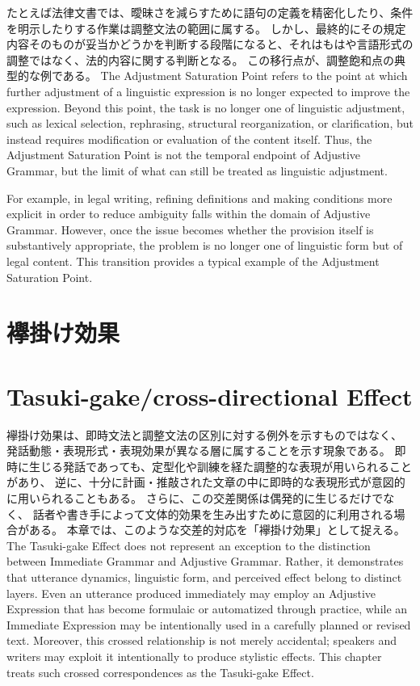 \documentclass[a4paper]{article}
\begin{document}
たとえば法律文書では、曖昧さを減らすために語句の定義を精密化したり、条件を明示したりする作業は調整文法の範囲に属する。
しかし、最終的にその規定内容そのものが妥当かどうかを判断する段階になると、それはもはや言語形式の調整ではなく、法的内容に関する判断となる。
この移行点が、調整飽和点の典型的な例である。
\else
The Adjustment Saturation Point refers to the point at which further adjustment of a linguistic expression is no longer expected to improve the expression.
Beyond this point, the task is no longer one of linguistic adjustment, such as lexical selection, rephrasing, structural reorganization, or clarification, but instead requires modification or evaluation of the content itself.
Thus, the Adjustment Saturation Point is not the temporal endpoint of Adjustive Grammar, but the limit of what can still be treated as linguistic adjustment.

For example, in legal writing, refining definitions and making conditions more explicit in order to reduce ambiguity falls within the domain of Adjustive Grammar.
However, once the issue becomes whether the provision itself is substantively appropriate, the problem is no longer one of linguistic form but of legal content.
This transition provides a typical example of the Adjustment Saturation Point.
\fi


\ifJPN
  \section{襷掛け効果}
\else
  \section{Tasuki-gake/cross-directional Effect}
\fi


\ifJPN
襷掛け効果は、即時文法と調整文法の区別に対する例外を示すものではなく、
発話動態・表現形式・表現効果が異なる層に属することを示す現象である。
即時に生じる発話であっても、定型化や訓練を経た調整的な表現が用いられることがあり、
逆に、十分に計画・推敲された文章の中に即時的な表現形式が意図的に用いられることもある。
さらに、この交差関係は偶発的に生じるだけでなく、
話者や書き手によって文体的効果を生み出すために意図的に利用される場合がある。
本章では、このような交差的対応を「襷掛け効果」として捉える。
\else
The Tasuki-gake Effect does not represent an exception to the distinction
between Immediate Grammar and Adjustive Grammar.
Rather, it demonstrates that utterance dynamics, linguistic form,
and perceived effect belong to distinct layers.
Even an utterance produced immediately may employ an Adjustive Expression
that has become formulaic or automatized through practice,
while an Immediate Expression may be intentionally used in a carefully planned
or revised text.
Moreover, this crossed relationship is not merely accidental;
speakers and writers may exploit it intentionally to produce stylistic effects.
This chapter treats such crossed correspondences as the Tasuki-gake Effect.
\fi
\end{document}

